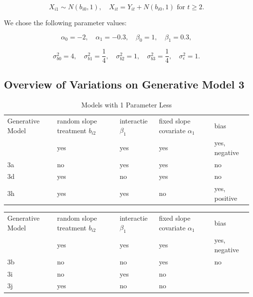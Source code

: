 \documentclass[
  12pt,
  a4paper,
]{article}
\begin{document}
\[
X_{i1} \sim N(b_{i0}, 1), \quad X_{it} = Y_{it} + N(b_{i0}, 1) \text{ for } t \geq 2.
\]

We chose the following parameter values:

\[
\alpha_0 = -2, \quad \alpha_1 = -0.3, \quad \beta_0 = 1, \quad \beta_1 = 0.3,
\]

\[
\sigma_{b0}^2 = 4, \quad \sigma_{b1}^2 = \frac{1}{4}, \quad \sigma_{b2}^2 = 1, \quad \sigma_{b3}^2 = \frac{1}{4}, \quad \sigma_\epsilon^2 = 1.
\]

\newpage

\subsection{Overview of Variations on Generative Model
3}\label{overview-of-variations-on-generative-model-3}

\begin{longtable}[]{@{}
  >{\raggedright\arraybackslash}p{}
  >{\raggedright\arraybackslash}p{}
  >{\raggedright\arraybackslash}p{}
  >{\raggedright\arraybackslash}p{}
  >{\raggedright\arraybackslash}p{}@{}}
\caption{Models with 1 Parameter Less}\tabularnewline
\toprule\noalign{}
\endfirsthead
\endhead
\bottomrule\noalign{}
\endlastfoot
Generative Model & random slope treatment \(b_{i2}\) & interactie
\(\beta_1\) & fixed slope covariate \(\alpha_1\) & bias \\
3 & yes & yes & yes & yes, negative \\
3a & no & yes & yes & no \\
3d & yes & no & yes & no \\
3h & yes & yes & no & yes, positive \\
\end{longtable}

\begin{longtable}[]{@{}
  >{\raggedright\arraybackslash}p{}
  >{\raggedright\arraybackslash}p{}
  >{\raggedright\arraybackslash}p{}
  >{\raggedright\arraybackslash}p{}
  >{\raggedright\arraybackslash}p{}@{}}
\toprule\noalign{}
\endhead
\bottomrule\noalign{}
\endlastfoot
Generative Model & random slope treatment \(b_{i2}\) & interactie
\(\beta_1\) & fixed slope covariate \(\alpha_1\) & bias \\
3 & yes & yes & yes & yes, negative \\
3b & no & no & yes & no \\
3i & no & yes & no & \\
3j & yes & no & no & \\
\end{longtable}
\end{document}
